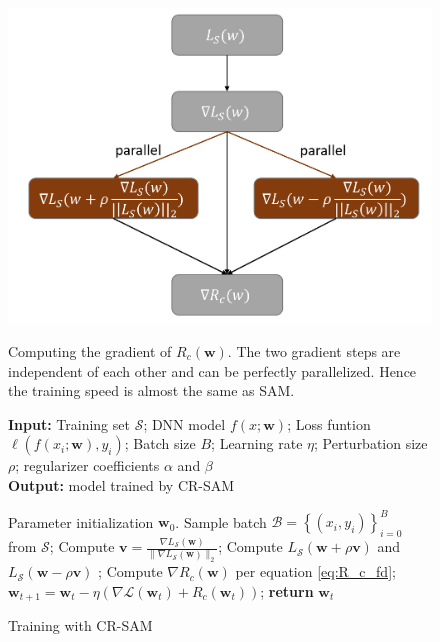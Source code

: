 \documentclass[letterpaper]{article} %
\theoremstyle{plain}
\theoremstyle{definition}
\begin{document}
\begin{figure}
\begin{minipage}{.45\textwidth}
\includegraphics[width=.9\textwidth]{figs/diagram.png}
\caption{Computing the gradient of $R_c(\boldsymbol{w})$. The two gradient steps are independent of each other and can be perfectly parallelized. Hence the training speed is almost the same as SAM.}
\label{fig:computation}
\end{minipage}
\hfill
\begin{minipage}{0.5\textwidth}
\begin{algorithm}[H]
\caption{Training with CR-SAM}
\label{alg:CR-SAM}
\begin{flushleft}
    \textbf{Input:} Training set $\mathcal{S}$; DNN model $f(x ; \boldsymbol{w})$; Loss funtion $\ell\left(f\left(x_i ; \boldsymbol{w}\right), y_i\right)$; Batch size $B$; Learning rate $\eta$; Perturbation size $\rho$; regularizer coefficients $\alpha$ and $\beta$ \\
    \textbf{Output:} model trained by CR-SAM
\end{flushleft}
\begin{algorithmic}[1]
    \State Parameter initialization $\boldsymbol{w}_0$.
        \State Sample batch $\mathcal{B}=\left\{\left({x}_i, {y}_i\right)\right\}_{i=0}^B$ from $\mathcal{S}$;
        \State Compute $\boldsymbol{v} = \frac{\nabla L_{\mathcal{S}}(\boldsymbol{w})}{\|\nabla L_{\mathcal{S}}(\boldsymbol{w})\|_2}$;
        \State Compute $L_{\mathcal{S}}(\boldsymbol{w}+\rho\boldsymbol{v})$ and $L_{\mathcal{S}}(\boldsymbol{w}-\rho\boldsymbol{v})$ ;
        \State Compute $\nabla R_c(\boldsymbol{w})$ per equation \ref{eq:R_c_fd};
        \State $\boldsymbol{w}_{t+1} = \boldsymbol{w}_t-\eta (\nabla\mathcal{L}\left(\boldsymbol{w}_t\right)+R_c\left(\boldsymbol{w}_t\right))$;
    \EndWhile
    \State \textbf{return} $\boldsymbol{w}_t$
\end{algorithmic}
\end{algorithm}
\end{minipage}
\end{figure}
\end{document}
